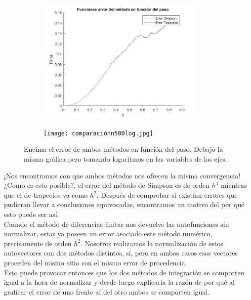 \documentclass[12pt]{article}
\begin{document}
        \begin{figure}[H]
    \centering
    \begin{subfigure}{1\textwidth}
            \includegraphics[width=0.9\textwidth]{comparacionn500.jpg}
    \end{subfigure}
    \hfill
    \begin{subfigure}{1\textwidth}
            \texttt{[image: comparaciónn500log.jpg]}
    \end{subfigure}
    \caption{Encima el error de ambos métodos en función del paso. Debajo la misma gráfica pero tomando logaritmos en las variables de los ejes.}
    \end{figure}

¡Nos encontramos con que ambos métodos nos ofrecen la misma convergencia! ¿Como es esto posible?, el error del método de Simpson es de orden $h^4$ mientras que el de trapecios va como $h^2$. Después de comprobar si existían errores que pudieran llevar a conclusiones equivocadas, encontramos un motivo del por qué esto puede ser así.\\

Cuando el método de diferencias finitas nos devuelve las autofunciones sin normalizar, estas ya poseen un error asociado  este método numérico, precisamente de orden $h^2$. Nosotros realizamos la normalización de estos autovectores con dos métodos distintos, sí, pero en ambos casos esos vectores proceden del mismo sitio con el mismo error de procedencia.\\

Esto puede provocar entonces que los dos métodos de integración se comporten igual a la hora de normalizar y desde luego explicaría la razón de por qué al graficar el error de uno frente al del otro ambos se comporten igual.
    
\end{document}
